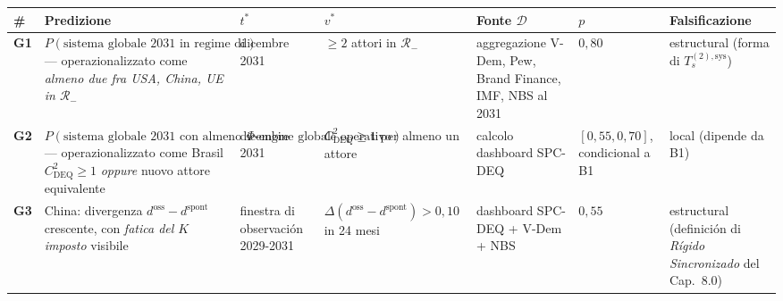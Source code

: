 {\def\LTcaptype{none} %
{\small\begin{longtable}[]{@{}
  >{\raggedright\arraybackslash}p{}
  >{\raggedright\arraybackslash}p{}
  >{\raggedright\arraybackslash}p{}
  >{\raggedright\arraybackslash}p{}
  >{\raggedright\arraybackslash}p{}
  >{\raggedright\arraybackslash}p{}
  >{\raggedright\arraybackslash}p{}@{}}
\toprule\noalign{}
\begin{minipage}[b]{\linewidth}\raggedright
\#
\end{minipage} & \begin{minipage}[b]{\linewidth}\raggedright
Predizione
\end{minipage} & \begin{minipage}[b]{\linewidth}\raggedright
\(t^*\)
\end{minipage} & \begin{minipage}[b]{\linewidth}\raggedright
\(v^*\)
\end{minipage} & \begin{minipage}[b]{\linewidth}\raggedright
Fonte \(\mathcal{D}\)
\end{minipage} & \begin{minipage}[b]{\linewidth}\raggedright
\(p\)
\end{minipage} & \begin{minipage}[b]{\linewidth}\raggedright
Falsificazione
\end{minipage} \\
\midrule\noalign{}
\endhead
\bottomrule\noalign{}
\endlastfoot
\textbf{G1} &
\(P(\text{sistema globale 2031 in regime di decoerenza generalizzata})\)
--- operazionalizzato come \emph{almeno due fra USA, China, UE in
\(\mathcal{R}_-\)} & dicembre 2031 & \(\geq 2\) attori in
\(\mathcal{R}_-\) & aggregazione V-Dem, Pew, Brand Finance, IMF, NBS al
2031 & \(0{,}80\) & estructural (forma di \(T_s^{(2),\text{sys}}\)) \\
\textbf{G2} &
\(P(\text{sistema globale 2031 con almeno un $\Phi$-engine globale operativo})\)
--- operazionalizzato come Brasil \(C_{\text{DEQ}}^2 \geq 1\)
\emph{oppure} nuovo attore equivalente & dicembre 2031 &
\(C_{\text{DEQ}}^2 \geq 1\) per almeno un attore & calcolo dashboard
SPC-DEQ & \([0{,}55, 0{,}70]\), condicional a B1 & local (dipende da
B1) \\
\textbf{G3} & China: divergenza \(d^{\text{oss}} - d^{\text{spont}}\)
crescente, con \emph{fatica del \(K\) imposto} visibile & finestra di
observación 2029-2031 &
\(\Delta(d^{\text{oss}} - d^{\text{spont}}) > 0{,}10\) in 24 mesi &
dashboard SPC-DEQ + V-Dem + NBS & \(0{,}55\) & estructural (definición
di \emph{Rígido Sincronizado} del Cap.~8.0) \\
\end{longtable}}
}

